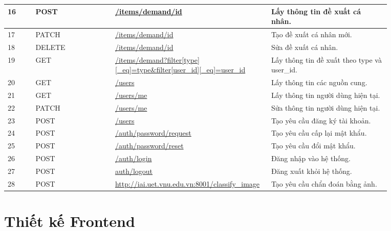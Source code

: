 \documentclass[./../main.tex]{subfiles}
\begin{document}
\begin{longtable}{| p{0.07\linewidth} | p{0.2\linewidth} | p{0.3\linewidth} | p{0.3\linewidth} |}
\centerline{16} & POST & \url{/items/demand/id} & Lấy thông tin đề xuất cá nhân. \\ \hline
\centerline{17} & PATCH & \url{/items/demand/id} & Tạo đề xuất cá nhân mới. \\ \hline
\centerline{18} & DELETE & \url{/items/demand/id} & Sửa đề xuất cá nhân. \\ \hline
\centerline{19} & GET & \url{/items/demand?filter[type][_eq]=type&filter[user_id][_eq]=user_id} & Lấy thông tin đề xuất theo type và user\_id. \\ \hline
\centerline{20} & GET & \url{/users} & Lấy thông tin các nguồn cung. \\ \hline
\centerline{21} & GET & \url{/users/me} & Lấy thông tin người dùng hiện tại. \\ \hline
\centerline{22} & PATCH & \url{/users/me} & Sửa thông tin người dùng hiện tại. \\ \hline
\centerline{23} & POST & \url{/users} & Tạo yêu cầu đăng ký tài khoản. \\ \hline
\centerline{24} & POST & \url{/auth/password/request} & Tạo yêu cầu cấp lại mật khẩu. \\ \hline
\centerline{25} & POST & \url{/auth/password/reset} & Tạo yêu cầu đổi mật khẩu. \\ \hline
\centerline{26} & POST & \url{/auth/login} & Đăng nhập vào hệ thống. \\ \hline
\centerline{27} & POST & \url{auth/logout} & Đăng xuất khỏi hệ thống. \\ \hline
\centerline{28} & POST & \url{http://iai.uet.vnu.edu.vn:8001/classify_image} & Tạo yêu cầu chẩn đoán bằng ảnh. \\ \hline
\end{longtable}

\section{Thiết kế Frontend}
\end{document}
